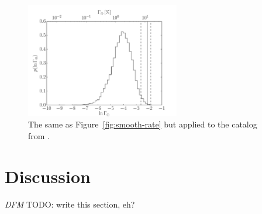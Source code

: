 \documentclass[12pt,preprint]{aastex}
\newcommand{\Fig}[1]{Figure~\ref{fig:#1}}
\newcommand{\fig}[1]{\Fig{#1}}
\newcommand{\figlabel}[1]{\label{fig:#1}}
\newcommand{\todo}[3]{{\color{#2} \emph{#1} TODO: #3}}
\newcommand{\dfmtodo}[1]{\todo{DFM}{red}{#1}}
\newcommand{\hoggtodo}[1]{\todo{HOGG}{blue}{#1}}
\begin{document}
\begin{figure}[p]
\begin{center}
\includegraphics[width=0.6\textwidth]{figures/results/rate.pdf}
\end{center}
\caption{%
The same as \fig{smooth-rate} but applied to the catalog from \citet{petigura}.
\figlabel{real-rate}}
\end{figure}

\section{Discussion}

\dfmtodo{write this section, eh?}



\end{document}
